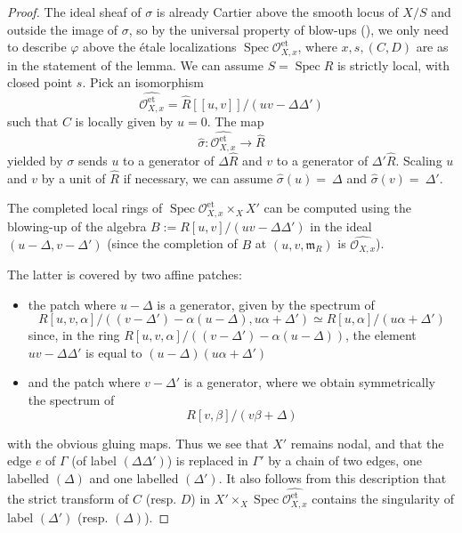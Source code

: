 \documentclass[a4paper,12pt]{amsart} %
\numberwithin{equation}{subsection}
\newcommand{\on}[1]{\operatorname{#1}}
\newcommand{\Spec}{\operatorname{Spec}}
\theoremstyle{definition}
\theoremstyle{plain}%
\theoremstyle{remark}
\renewcommand{\phi}{\varphi}
\renewcommand{\O}{\mathcal{O}}
\begin{document}
\begin{proof}
The ideal sheaf of $\sigma$ is already Cartier above the smooth locus of $X/S$ and outside the image of $\sigma$, so by the universal property of blow-ups (\cite[\href{https://stacks.math.columbia.edu/tag/0806}{Tag 0806}]{stacks-project}), we only need to describe $\phi$ above the  \'etale localizations $\Spec\O_{X,x}^{\on{et}}$, where $x,s,(C,D)$ are as in the statement of the lemma. We can assume $S=\Spec R$ is strictly local, with closed point $s$. Pick an isomorphism
\[
\widehat{\O_{X,x}^{\on{et}}}=\widehat{R}[[u,v]]/(uv-\Delta\Delta')
\]
such that $C$ is locally given by $u=0$. The map
\[
\widehat{\sigma}\colon\widehat{\O_{X,x}^{\on{et}}}\to\widehat{R}
\]
yielded by $\sigma$ sends $u$ to a generator of $\Delta \widehat R$ and $v$ to a generator of $\Delta' \widehat R$. Scaling $u$ and $v$ by a unit of $\widehat R$ if necessary, we can assume $\widehat{\sigma}(u)=~\Delta$ and $\widehat{\sigma}(v)=~\Delta'$.

The completed local rings of $\Spec \O_{X,x}^{\on{et}}\times_X X'$ can be computed using the blowing-up of the algebra $B:=R[u,v]/(uv-\Delta\Delta')$ in the ideal $(u-\Delta,v-\Delta')$ (since the completion of $B$ at $(u,v,\mathfrak{m}_R)$ is $\widehat{\O_{X,x}}$).
	
	The latter is covered by two affine patches:
	
	\begin{itemize} 
	
	\item the patch where $u-\Delta$ is a generator, given by the spectrum of
	\[
	R[u,v,\alpha]/((v-\Delta')-\alpha(u-\Delta),u\alpha+\Delta')\simeq R[u,\alpha]/(u\alpha+\Delta')
	\]
	since, in the ring $R[u,v,\alpha]/((v-\Delta')-\alpha(u-\Delta))$, the element $uv-\Delta\Delta'$ is equal to $(u-\Delta)(u\alpha+\Delta')$
	
	\item and the patch where $v-\Delta'$ is a generator, where we obtain symmetrically the spectrum of
	\[
	R[v,\beta]/(v\beta+\Delta)
	\]
	\end{itemize}
	with the obvious gluing maps. Thus we see that $X'$ remains nodal, and that the edge $e$ of $\Gamma$ (of label $(\Delta\Delta')$) is replaced in $\Gamma'$ by a chain of two edges, one labelled $(\Delta)$ and one labelled $(\Delta')$. It also follows from this description that the strict transform of $C$ (resp. $D$) in $X'\times_X \Spec\widehat{\O_{X,x}^{\on{et}}}$ contains the singularity of label $(\Delta')$ (resp. $(\Delta)$).
\end{proof}
\end{document}
